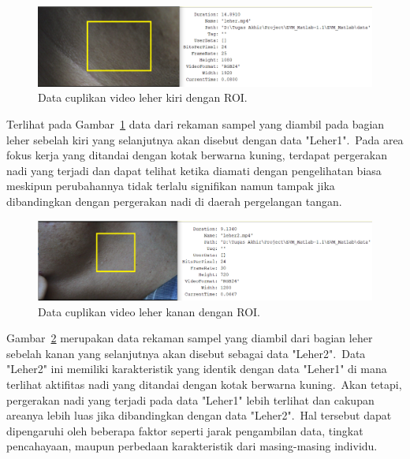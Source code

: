 \begin{figure}[ht]
	\vspace{0.5em}
	\centering
	\includegraphics[width=\textwidth]{leher1_roi}
	\caption{Data cuplikan video leher kiri dengan ROI.}
	\label{fig:leher1}   
\end{figure}
 Terlihat pada Gambar~\ref{fig:leher1} data dari rekaman sampel yang diambil pada bagian leher sebelah kiri yang selanjutnya akan disebut dengan data "Leher1".~Pada area fokus kerja yang ditandai dengan kotak berwarna kuning, terdapat pergerakan nadi yang terjadi dan dapat telihat ketika diamati dengan pengelihatan biasa meskipun perubahannya tidak terlalu signifikan namun tampak jika dibandingkan dengan pergerakan nadi di daerah pergelangan tangan.
\newpage
\begin{figure}[ht]
	\vspace{0.5em}
	\centering
	\includegraphics[width=\textwidth]{leher2_roi}
	\caption{Data cuplikan video leher kanan dengan ROI.}
	\label{fig:leher2}   
\end{figure}
Gambar~\ref{fig:leher2} merupakan data rekaman sampel yang diambil dari bagian leher sebelah kanan yang selanjutnya akan disebut sebagai data "Leher2".~Data "Leher2" ini memiliki karakteristik yang identik dengan data "Leher1" di mana terlihat aktifitas nadi yang ditandai dengan kotak berwarna kuning.~Akan tetapi, pergerakan nadi yang terjadi pada data "Leher1" lebih terlihat dan cakupan areanya lebih luas jika dibandingkan dengan data "Leher2".~Hal tersebut dapat dipengaruhi oleh beberapa faktor seperti jarak pengambilan data, tingkat pencahayaan, maupun perbedaan karakteristik dari masing-masing individu.

